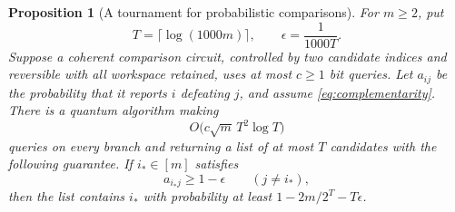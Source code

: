 \documentclass[11pt]{article}
\newtheorem{proposition}[theorem]{Proposition}
\theoremstyle{definition}
\begin{document}
\begin{proposition}[A tournament for probabilistic comparisons]
\label{prop:tournament}
For $m\ge2$, put
\[
 T=\lceil\log(1000m)\rceil,
 \qquad \epsilon=\frac{1}{1000T}.
\]
Suppose a coherent comparison circuit, controlled by two candidate
indices and reversible with all workspace retained, uses at most
$c\ge1$ bit queries. Let $a_{ij}$ be the probability that it reports
$i$ defeating $j$, and assume \eqref{eq:complementarity}. There is
a quantum algorithm making
\[
 O\bigl(c\sqrt m\,T^2\log T\bigr)
\]
queries on every branch and returning a list of at most $T$ candidates
with the following guarantee. If $i_\ast\in[m]$ satisfies
\begin{equation}\label{eq:dominant}
 a_{i_\ast j}\ge1-\epsilon\qquad(j\ne i_\ast),
\end{equation}
then the list contains $i_\ast$ with probability at least
$1-2m/2^T-T\epsilon$.
\end{proposition}
\end{document}

